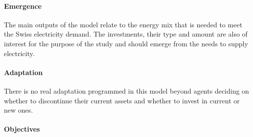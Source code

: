 \paragraph{Emergence}

The main outputs of the model relate to the energy mix that is needed to meet the Swiss electricity demand. The investments, their type and amount are also of interest for the purpose of the study and should emerge from the needs to supply electricity.

\paragraph{Adaptation}

There is no real adaptation programmed in this model beyond agents deciding on whether to discontinue their current assets and whether to invest in current or new ones.

\paragraph{Objectives}

